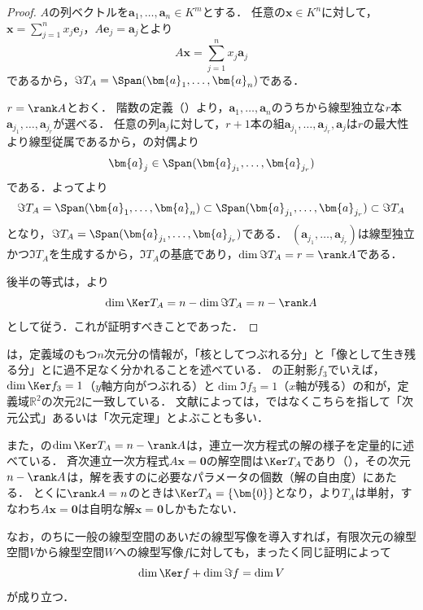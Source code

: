 \begin{leftbar}
\begin{proof}
  $A$の列ベクトルを$\bm{a}_1, \dots, \bm{a}_n \in K^m$とする．
  任意の$\bm{x} \in K^n$に対して，$\bm{x} = \sum_{j=1}^{n} x_j \bm{e}_j$，$A\bm{e}_j = \bm{a}_j$とより
  \[
    A\bm{x} = \sum_{j=1}^{n} x_j \bm{a}_j
  \]
  であるから，$\Im T_A = \Span(\bm{a}_1, \dots, \bm{a}_n)$である．

  $r = \rank A$とおく．
  階数の定義（）より，$\bm{a}_1, \dots, \bm{a}_n$のうちから線型独立な$r$本$\bm{a}_{j_1}, \dots, \bm{a}_{j_r}$が選べる．
  任意の列$\bm{a}_j$に対して，$r + 1$本の組$\bm{a}_{j_1}, \dots, \bm{a}_{j_r}, \bm{a}_j$は$r$の最大性より線型従属であるから，の対偶より
  \[
    \bm{a}_j \in \Span(\bm{a}_{j_1}, \dots, \bm{a}_{j_r})
  \]
  である．よってより
  \[
    \Im T_A = \Span(\bm{a}_1, \dots, \bm{a}_n)
    \subset \Span(\bm{a}_{j_1}, \dots, \bm{a}_{j_r})
    \subset \Im T_A
  \]
  となり，$\Im T_A = \Span(\bm{a}_{j_1}, \dots, \bm{a}_{j_r})$である．
  $(\bm{a}_{j_1}, \dots, \bm{a}_{j_r})$は線型独立かつ$\Im T_A$を生成するから，$\Im T_A$の基底であり，$\dim \Im T_A = r = \rank A$である．

  後半の等式は，より
  \[
    \dim \Ker T_A = n - \dim \Im T_A = n - \rank A
  \]
  として従う．これが証明すべきことであった．
\end{proof}
\end{leftbar}

\begin{remark}[次元公式の解釈と解の自由度]
  は，定義域のもつ$n$次元分の情報が，「核としてつぶれる分」と「像として生き残る分」とに過不足なく分かれることを述べている．
  の正射影$f_3$でいえば，$\dim \Ker f_3 = 1$（$y$軸方向がつぶれる）と$\dim \Im f_3 = 1$（$x$軸が残る）の和が，定義域$\mathbb{R}^2$の次元$2$に一致している．
  文献によっては，ではなくこちらを指して「次元公式」あるいは「次元定理」とよぶことも多い．

  また，の$\dim \Ker T_A = n - \rank A$は，連立一次方程式の解の様子を定量的に述べている．
  斉次連立一次方程式$A\bm{x} = \bm{0}$の解空間は$\Ker T_A$であり（），その次元$n - \rank A$は，解を表すのに必要なパラメータの個数（解の自由度）にあたる．
  とくに$\rank A = n$のときは$\Ker T_A = \{\bm{0}\}$となり，より$T_A$は単射，すなわち$A\bm{x} = \bm{0}$は自明な解$\bm{x} = \bm{0}$しかもたない．

  なお，のちに一般の線型空間のあいだの線型写像を導入すれば，有限次元の線型空間$V$から線型空間$W$への線型写像$f$に対しても，まったく同じ証明によって
  \[
    \dim \Ker f + \dim \Im f = \dim V
  \]
  が成り立つ．
\end{remark}

